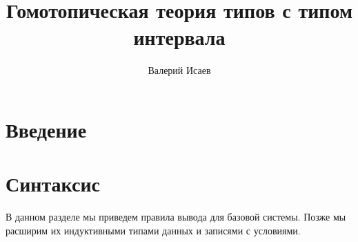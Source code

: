 \documentclass{amsart}
\theoremstyle{definition}
\theoremstyle{remark}
\numberwithin{figure}{section}
\begin{document}
\title{Гомотопическая теория типов с типом интервала}

\author{Валерий Исаев}


\maketitle

\section{Введение}

\section{Синтаксис}

В данном разделе мы приведем правила вывода для базовой системы.
Позже мы расширим их индуктивными типами данных и записями с условиями.

\centerAlignProof
\end{document}

